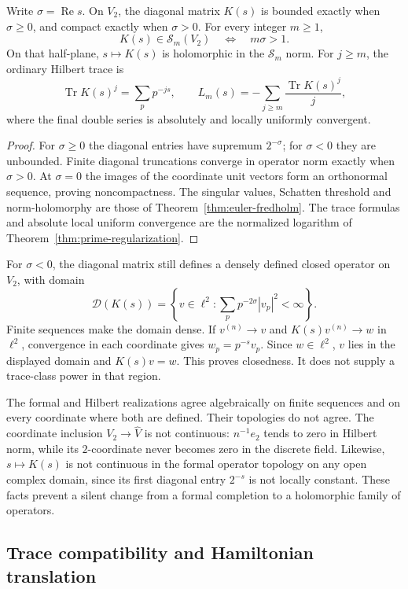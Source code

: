 \begin{proposition}
\label{prop:da-operator-domains}
Write $\sigma=\operatorname{Re}s$. On $V_2$, the diagonal matrix
$K(s)$ is bounded exactly when $\sigma\geq0$, and compact exactly
when $\sigma>0$. For every integer $m\geq1$,
\[
 K(s)\in \mathcal S_m(V_2)\quad\Longleftrightarrow\quad m\sigma>1.
\]
On that half-plane, $s\mapsto K(s)$ is holomorphic in the
$\mathcal S_m$ norm. For $j\geq m$, the ordinary Hilbert trace is
\[
 \operatorname{Tr}K(s)^j=\sum_p p^{-js},\qquad
 L_m(s)=-\sum_{j\geq m}\frac{\operatorname{Tr}K(s)^j}{j},
\]
where the final double series is absolutely and locally uniformly
convergent.
\end{proposition}
\begin{proof}
For $\sigma\ge0$ the diagonal entries have supremum $2^{-\sigma}$;
for $\sigma<0$ they are unbounded. Finite diagonal truncations converge
in operator norm exactly when $\sigma>0$. At $\sigma=0$ the images
of the coordinate unit vectors form an orthonormal sequence, proving
noncompactness. The singular values, Schatten threshold and
norm-holomorphy are those of Theorem~\ref{thm:euler-fredholm}.
The trace formulas and absolute local uniform convergence are the
normalized logarithm of Theorem~\ref{thm:prime-regularization}.
\end{proof}

For $\sigma<0$, the diagonal matrix still defines a densely defined
closed operator on $V_2$, with domain
\[
 \mathcal D(K(s))=
 \left\{v\in\ell^2:\sum_p p^{-2\sigma}|v_p|^2<\infty\right\}.
\]
Finite sequences make the domain dense. If $v^{(n)}\to v$ and
$K(s)v^{(n)}\to w$ in $\ell^2$, convergence in each coordinate gives
$w_p=p^{-s}v_p$. Since $w\in\ell^2$, $v$ lies in the displayed
domain and $K(s)v=w$. This proves closedness. It does not supply
a trace-class power in that region.

The formal and Hilbert realizations agree algebraically on finite
sequences and on every coordinate where both are defined.
Their topologies do not agree. The coordinate inclusion
$V_2\to\widehat V$ is not continuous: $n^{-1}e_2$ tends to zero
in Hilbert norm, while its $2$-coordinate never becomes zero in
the discrete field. Likewise, $s\mapsto K(s)$ is not continuous
in the formal operator topology on any open complex domain, since
its first diagonal entry $2^{-s}$ is not locally constant.
These facts prevent a silent change from a formal completion to
a holomorphic family of operators.

\subsection{Trace compatibility and Hamiltonian translation}
\label{sec:da-trace-comparison}

